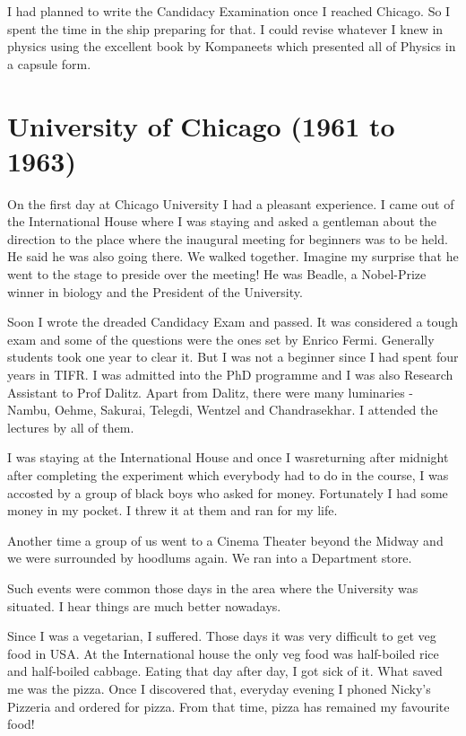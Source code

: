 I had planned to write the Candidacy Examination once I reached Chicago. 
So I spent the time in the ship preparing for that. I could revise 
whatever I knew in physics using the excellent book by Kompaneets which 
presented all of Physics in a capsule form.

\section*{University of Chicago (1961 to 1963)}

On the first day at Chicago University I had a pleasant experience. I 
came out of the International House where I was staying and asked a 
gentleman about the direction to the place where the inaugural meeting 
for beginners was to be held. He said he was also going there. We walked 
together. Imagine my surprise that he went to the stage to preside over 
the meeting! He was Beadle, a Nobel-Prize winner in biology and the 
President of the University.
    
Soon I wrote the dreaded Candidacy Exam and passed. It was considered a 
tough exam and some of the questions were the ones set by Enrico Fermi. 
Generally students took one year to clear it. But I was not a beginner 
since I had spent four years in TIFR. I was admitted into the PhD 
programme and I was also Research Assistant to Prof Dalitz. Apart from 
Dalitz, there were many luminaries - Nambu, Oehme, Sakurai, Telegdi, 
Wentzel and Chandrasekhar. I attended the lectures by all of them.

I was staying at the International House and once I was\break returning after 
midnight after completing the experiment which everybody had to do in 
the course, I was accosted by a group of black boys who asked for money. 
Fortunately I had some money in my pocket. I threw it at them and ran 
for my life.

Another time a group of us went to a Cinema Theater beyond the Midway 
and we were surrounded by hoodlums again. We ran into a Department 
store.

Such events were common those days in the area where the University was 
situated. I hear things are much better nowadays.

Since I was a vegetarian, I suffered. Those days it was very difficult 
to get veg food in USA. At the International house the only veg food was 
half-boiled rice and half-boiled cabbage. Eating that day after day, I 
got sick of it. What saved me was the pizza. Once I discovered that, 
everyday evening I phoned Nicky's Pizzeria and ordered for pizza. From 
that time, pizza has remained my favourite food!
 
